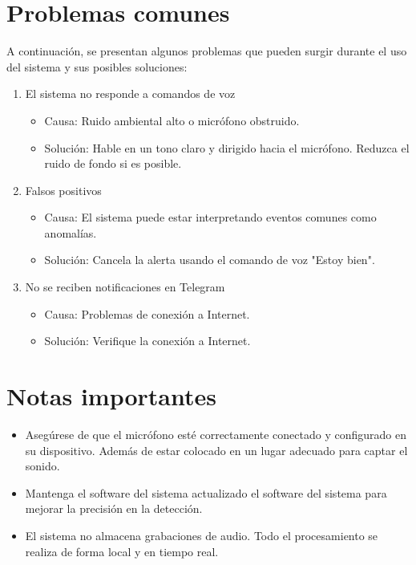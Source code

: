 \section*{Problemas comunes}

A continuación, se presentan algunos problemas que pueden surgir durante el uso del sistema y sus posibles soluciones:

\begin{enumerate}
  \item El sistema no responde a comandos de voz
  \begin{itemize}
    \item Causa: Ruido ambiental alto o micrófono obstruido.
    \item Solución: Hable en un tono claro y dirigido hacia el micrófono. Reduzca el ruido de fondo si es posible.
  \end{itemize}
  \item Falsos positivos
  \begin{itemize}
    \item Causa: El sistema puede estar interpretando eventos comunes como anomalías.
    \item Solución: Cancela la alerta usando el comando de voz "Estoy bien".
  \end{itemize}
  \item No se reciben notificaciones en Telegram
  \begin{itemize}
    \item Causa: Problemas de conexión a Internet.
    \item Solución: Verifique la conexión a Internet.
  \end{itemize}
\end{enumerate}

\section*{Notas importantes}
\begin{itemize}
  \item Asegúrese de que el micrófono esté correctamente conectado y configurado en su dispositivo. Además de estar colocado en un lugar adecuado para captar el sonido.
  \item Mantenga el software del sistema actualizado el software del sistema para mejorar la precisión en la detección.
  \item El sistema no almacena grabaciones de audio. Todo el procesamiento se realiza de forma local y en tiempo real.
\end{itemize}
